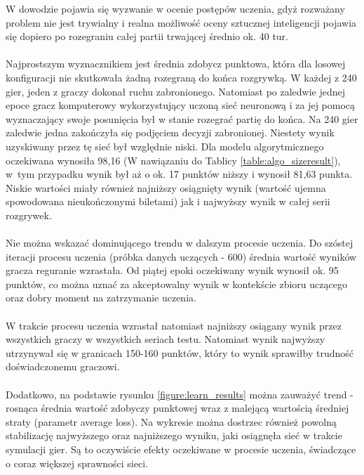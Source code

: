 \documentclass[12pt, oneside]{report}
\begin{document}
	W dowodzie pojawia się wyzwanie w ocenie postępów uczenia, gdyż rozważany problem nie jest trywialny i realna możliwość oceny sztucznej inteligencji pojawia się dopiero po rozegraniu całej partii trwającej średnio ok. 40 tur. \\ \\
	Najprostszym wyznacznikiem jest średnia zdobycz punktowa, która dla losowej konfiguracji nie skutkowała żadną rozegraną do końca rozgrywką. W każdej z 240 gier, jeden z graczy dokonał ruchu zabronionego. Natomiast po zaledwie jednej epoce gracz komputerowy wykorzystujący uczoną sieć neuronową i za jej pomocą wyznaczający swoje posunięcia był w stanie rozegrać partię do końca. Na 240 gier zaledwie jedna zakończyła się podjęciem decyzji zabronionej. Niestety wynik uzyskiwany przez tę sieć był względnie niski. Dla modelu algorytmicznego oczekiwana wynosiła 98,16 (W nawiązaniu do Tablicy \ref{table:algo_sizeresult}), w~tym przypadku wynik był aż o ok. 17 punktów niższy i wynosił 81,63 punkta. Niskie wartości miały również najniższy osiągnięty wynik (wartość ujemna spowodowana nieukończonymi biletami) jak i najwyższy wynik w całej serii rozgrywek. \\ \\
	Nie można wskazać dominującego trendu w dalszym procesie uczenia. Do szóstej iteracji procesu uczenia (próbka danych uczących - 600) średnia wartość wyników gracza reguranie wzrastała. Od piątej epoki oczekiwany wynik wynosił ok. 95 punktów, co można uznać za akceptowalny wynik w kontekście zbioru uczącego oraz dobry moment na zatrzymanie uczenia.
	\\ \\ W trakcie procesu uczenia wzrastał natomiast najniższy osiągany wynik przez wszystkich graczy w wszystkich seriach testu. Natomiast wynik najwyższy utrzynywał się w granicach 150-160 punktów, który to wynik sprawiłby trudność doświadczonemu graczowi. \\ \\
	Dodatkowo, na podstawie rysunku \ref{figure:learn_results} można zauważyć trend - rosnąca średnia wartość zdobyczy punktowej wraz z malejącą wartością średniej straty (parametr average loss). Na wykresie można dostrzec również powolną stabilizację najwyższego oraz najniższego wyniku, jaki osiągnęła sieć w trakcie symulacji gier. Są to oczywiście efekty oczekiwane w procesie uczenia, świadczące o coraz większej sprawności sieci.
\end{document}
